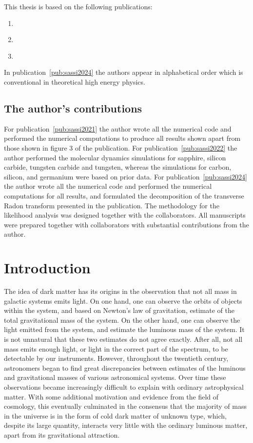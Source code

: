 This thesis is based on the following publications:
\begin{enumerate}[label = \Roman*, ref = \Roman*]
    \item\label{pub:sassi2021} 
    \item\label{pub:sassi2022} 
    \item\label{pub:sassi2024} 
\end{enumerate}
In publication~\ref{pub:sassi2024} the authors appear in alphabetical order which is conventional in theoretical high energy physics.

\section*{The author's contributions}

For publication~\ref{pub:sassi2021} the author wrote all the numerical code and performed the numerical computations to produce all results shown apart from those shown in figure 3 of the publication. For publication~\ref{pub:sassi2022} the author performed the molecular dynamics simulations for sapphire, silicon carbide, tungsten carbide and tungsten, whereas the simulations for carbon, silicon, and germanium were based on prior data. For publication~\ref{pub:sassi2024} the author wrote all the numerical code and performed the numerical computations for all results, and formulated the decomposition of the transverse Radon transform presented in the publication. The methodology for the likelihood analysis was designed together with the collaborators. All manuscripts were prepared together with collaborators with substantial contributions from the author.

\cleardoublepage
\mainmatter

\chapter{Introduction}

The idea of dark matter has its origins in the observation that not all mass in galactic systems emits light. On one hand, one can observe the orbits of objects within the system, and based on Newton's law of gravitation, estimate of the total gravitational mass of the system. On the other hand, one can observe the light emitted from the system, and estimate the luminous mass of the system. It is not unnatural that these two estimates do not agree exactly. After all, not all mass emits enough light, or light in the correct part of the spectrum, to be detectable by our instruments. However, throughout the twentieth century, astronomers began to find great discrepancies between estimates of the luminous and gravitational masses of various astronomical systems. Over time these observations became increasingly difficult to explain with ordinary astrophysical matter. With some additional motivation and evidence from the field of cosmology, this eventually culminated in the consensus that the majority of mass in the universe is in the form of cold dark matter of unknown type, which, despite its large quantity, interacts very little with the ordinary luminous matter, apart from its gravitational attraction.

